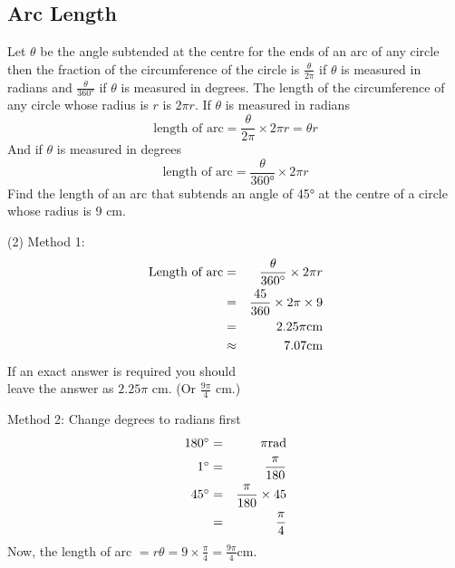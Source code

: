 \subsection*{Arc Length}
Let $\theta $ be the angle subtended at the centre for the ends of an arc of any circle then the fraction of the circumference of the circle is $\frac{\theta }{2 \pi }$ if $\theta $ is measured in radians and $\frac{\theta }{\ang{360}}$ if $\theta $ is measured in degrees. The length of the circumference of any circle whose radius is $r$ is $2 \pi  r$. If $\theta $ is measured in radians
\begin{equation*}\text{length of arc} =\frac{\theta }{2 \pi } \times 2 \pi  r =\theta  r
\end{equation*}
And if $\theta $ is measured in degrees
\begin{equation*}\text{length of arc} =\frac{\theta }{\ang{360}} \times 2 \pi  r
\end{equation*}
\example Find the length of an arc that subtends an angle of \ang{45} at the centre of a circle whose radius is 9 cm. 

\solution \begin{tasks}(2)
	\task Method 1:\begin{eqnarray*}\text{Length of arc} &  = & \frac{\theta }{360 \mbox{{\ensuremath{{}^\circ}}}} \times 2 \pi  r \\
	&  = & \frac{45}{360} \times 2 \pi  \times 9 \\
	&  = & 2.25 \pi \text{}\mbox{cm} \\
	&  \approx  & 7.07\text{}\mbox{cm}\end{eqnarray*}
If an exact answer is required you should\\ leave the answer as $2.25 \pi $ $\mbox{cm}$. (Or $\frac{9 \pi }{4}$ $\mbox{cm}\text{.}$) 

\task Method 2: Change degrees to radians first
\begin{eqnarray*}180 \mbox{{\ensuremath{{}^\circ}}} &  = & \pi \text{}\mbox{rad} \\
	1 \mbox{{\ensuremath{{}^\circ}}} &  = & \frac{\pi }{180} \\
	45 \mbox{{\ensuremath{{}^\circ}}} &  = & \frac{\pi }{180} \times 45 \\
	&  = & \frac{\pi }{4}\end{eqnarray*}
Now, the length of arc $= r \theta = 9 \times \frac{\pi }{4} =\frac{9 \pi }{4}\text{}\mbox{cm}$.
\end{tasks}
